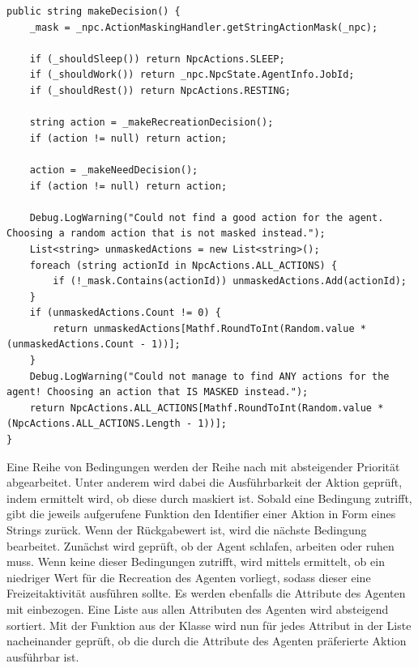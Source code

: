 \begin{minipage}{\linewidth}
\begin{lstlisting}[linewidth=16.4cm, label=lst:manual_decision_maker_make_decision, caption=Funktion \inlinecode{makeDecision} im \inlinecode{ManualDecisionMaker}, xleftmargin=1cm, basicstyle=\footnotesize]
public string makeDecision() {
    _mask = _npc.ActionMaskingHandler.getStringActionMask(_npc);

    if (_shouldSleep()) return NpcActions.SLEEP;
    if (_shouldWork()) return _npc.NpcState.AgentInfo.JobId;
    if (_shouldRest()) return NpcActions.RESTING;

    string action = _makeRecreationDecision();
    if (action != null) return action;

    action = _makeNeedDecision();
    if (action != null) return action;

    Debug.LogWarning("Could not find a good action for the agent. Choosing a random action that is not masked instead.");
    List<string> unmaskedActions = new List<string>();
    foreach (string actionId in NpcActions.ALL_ACTIONS) {
        if (!_mask.Contains(actionId)) unmaskedActions.Add(actionId);
    }
    if (unmaskedActions.Count != 0) {
        return unmaskedActions[Mathf.RoundToInt(Random.value * (unmaskedActions.Count - 1))];
    }
    Debug.LogWarning("Could not manage to find ANY actions for the agent! Choosing an action that IS MASKED instead.");
    return NpcActions.ALL_ACTIONS[Mathf.RoundToInt(Random.value * (NpcActions.ALL_ACTIONS.Length - 1))];
}
\end{lstlisting}
\end{minipage}

Eine Reihe von Bedingungen werden der Reihe nach mit absteigender Priorität abgearbeitet. Unter anderem wird dabei die Ausführbarkeit der Aktion geprüft, indem ermittelt wird, ob diese durch  maskiert ist. Sobald eine Bedingung zutrifft, gibt die jeweils aufgerufene Funktion den Identifier einer Aktion in Form eines Strings zurück. Wenn der Rückgabewert  ist, wird die nächste Bedingung bearbeitet. Zunächst wird geprüft, ob der Agent schlafen, arbeiten oder ruhen muss.
Wenn keine dieser Bedingungen zutrifft, wird mittels  ermittelt, ob ein niedriger Wert für die Recreation des Agenten vorliegt, sodass dieser eine Freizeitaktivität ausführen sollte. Es werden ebenfalls die Attribute des Agenten mit einbezogen. Eine Liste aus allen Attributen des Agenten wird absteigend sortiert. Mit der Funktion  aus der Klasse  wird nun für jedes Attribut in der Liste nacheinander geprüft, ob die durch die Attribute des Agenten präferierte Aktion ausführbar ist.

